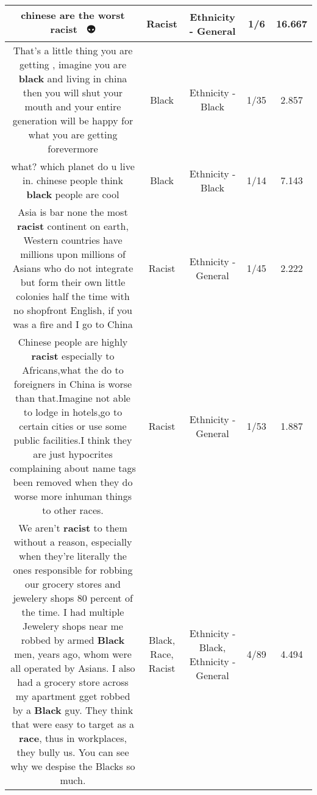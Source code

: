 \documentclass[11pt]{article}
\newlength\mylength
\begin{document}
\begin{center}
\begin{longtable}{|C{.65\mylength}|C{.30\mylength}|C{.12\mylength}|C{.12\mylength}|C{.12\mylength}|}
  \small chinese are the worst \textbf{racist}   👊🙈👽\normalsize   & Racist & Ethnicity - General & 1/6 & 16.667 \\  \hline
  \small That's a little thing you are getting , imagine you are \textbf{black} and living in china then you will shut your mouth and your entire generation will be happy for what you are getting forevermore\normalsize   & Black & Ethnicity - Black & 1/35 & 2.857 \\  \hline
  \small what? which planet do u live in. chinese people  think \textbf{black} people are cool\normalsize   & Black & Ethnicity - Black & 1/14 & 7.143 \\  \hline
  \small Asia is bar none the most \textbf{racist} continent on earth, Western countries have millions upon millions of Asians who do not integrate but form their own little colonies half the time with no shopfront English, if you was a fire and I go to China\normalsize   & Racist & Ethnicity - General & 1/45 & 2.222 \\  \hline
  \small Chinese people are highly \textbf{racist} especially to Africans,what the do to foreigners in China is worse than that.Imagine not able to lodge in hotels,go to certain cities or use some public facilities.I think they are just hypocrites complaining about name tags been removed when they do worse more inhuman things to other races.\normalsize   & Racist & Ethnicity - General & 1/53 & 1.887 \\  \hline
  \small We aren't \textbf{racist} to them without a reason, especially when they're literally the ones responsible for robbing our grocery stores and jewelery shops 80 percent of the time. I had multiple Jewelery shops near me robbed by armed \textbf{Black} men, years ago, whom were all operated by Asians. I also had a grocery store across my apartment gget robbed by a \textbf{Black} guy. They think that were easy to target as a \textbf{race}, thus in workplaces, they bully us. You can see why we despise the Blacks so much.\normalsize   & Black, Race, Racist & Ethnicity - Black, Ethnicity - General & 4/89 & 4.494 \\  \hline

\end{longtable}
\end{center}
\end{document}
